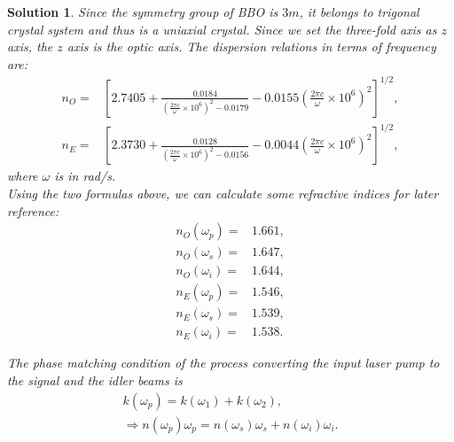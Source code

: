 \documentclass[UTF8,10pt,a4paper]{article}
\theoremstyle{Problem}
\theoremstyle{Solution}
\newtheorem*{sol}{Solution}
\begin{document}
\begin{sol}
    Since the symmetry group of BBO is $3m$, it belongs to trigonal crystal system and thus is a uniaxial crystal. Since we set the three-fold axis as $z$ axis, the $z$ axis is the optic axis. The dispersion relations in terms of frequency are:
    \begin{align}
        n_O=&\left[2.7405+\frac{0.0184}{\left(\frac{2\pi c}{\omega}\times 10^6\right)^2-0.0179}-0.0155\left(\frac{2\pi c}{\omega}\times 10^6\right)^2\right]^{1/2},\\
        n_E=&\left[2.3730+\frac{0.0128}{\left(\frac{2\pi c}{\omega}\times 10^6\right)^2-0.0156}-0.0044\left(\frac{2\pi c}{\omega}\times 10^6\right)^2\right]^{1/2},
    \end{align}
    where $\omega$ is in rad/s.\\
    Using the two formulas above, we can calculate some refractive indices for later reference:
    \begin{align}
        n_O(\omega_p)=&1.661,\\
        n_O(\omega_s)=&1.647,\\
        n_O(\omega_i)=&1.644,\\
        n_E(\omega_p)=&1.546,\\
        n_E(\omega_s)=&1.539,\\
        n_E(\omega_i)=&1.538.
    \end{align}

    The phase matching condition of the process converting the input laser pump to the signal and the idler beams is
    \begin{gather}
        k(\omega_p)=k(\omega_1)+k(\omega_2),\\
        \Longrightarrow n(\omega_p)\omega_p=n(\omega_s)\omega_s+n(\omega_i)\omega_i.
    \end{gather}


\end{sol}
\end{document}
